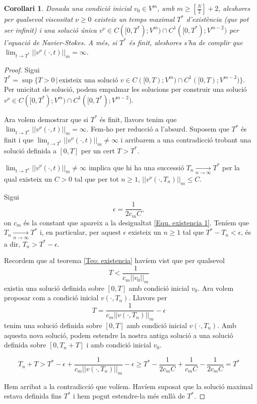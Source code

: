 \documentclass{article}
\numberwithin{equation}{section}
\newtheorem{corollari}{Corol\textperiodcentered lari}[section]
\begin{document}
\begin{corollari}\label{Cor: existencia global}
Donada una condici\'{o} inicial $v_0\in V^m$, amb $m\geq\left[\frac{N}{2}\right]+2$, aleshores per qualsevol viscositat $\nu\geq0$ existeix un temps maximal $T^*$ d'exist\`{e}ncia (que pot ser infinit) i una soluci\'{o} \'{u}nica $v^{\nu}\in C([0,T^*);V^m)\cap C^1([0,T^*);V^{m-2})$ per l'equaci\'{o} de Navier-Stokes. A m\'{e}s, si $T^*$ \'{e}s finit, aleshores s'ha de complir que $\lim_{t\to T^*}||v^{\nu}(\cdot,t)||_m=\infty$.
\end{corollari}
\begin{proof}
Sigui $T^*=\sup\{T>0\,|\,\text{existeix una soluci\'{o} }v\in C([0,T);V^m)\cap C^1([0,T);V^{m-2})\}$. Per unicitat de soluci\'{o}, podem empalmar les solucions per construir una soluci\'{o} $v^{\nu}\in C([0,T^*);V^m)\cap C^1([0,T^*);V^{m-2})$.

Ara volem demostrar que si $T^*$ \'{e}s finit, llavors tenim que $\lim_{t\to T^*}||v^{\nu}(\cdot,t)||_m=\infty$. Fem-ho per reducci\'{o} a l'absurd. Suposem que $T^*$ \'{e}s finit i que $\lim_{t\to T^*}||v^{\nu}(\cdot,t)||_m\neq\infty$ i arribarem a una contradicci\'{o} trobant una soluci\'{o} definida a $[0,T]$ per un cert $T>T^*$.

$\lim_{t\to T^*}||v^{\nu}(\cdot,t)||_m\neq\infty$ implica que hi ha una successi\'{o} $T_n\xrightarrow[n\to\infty]{}T^*$ per la qual existeix un $C>0$ tal que per tot $n\geq1$, $||v^{\nu}(\cdot,T_n)||_m\leq C$.

Sigui
\[\epsilon=\frac{1}{2c_mC},\]
on $c_m$ \'{e}s la constant que apareix a la desigualtat \eqref{Equ. existencia 1}. Ten\'{i}em que $T_n\xrightarrow[n\to\infty]{}T^*$ i, en particular, per aquest $\epsilon$ existeix un $n\geq1$ tal que $T^*-T_n<\epsilon$, \'{e}s a dir, $T_n>T^*-\epsilon$.

Recordem que al teorema \ref{Teo: existencia} hav\'{i}em vist que per qualsevol
\[T<\frac{1}{c_m||v_0||_m}\]
existia una soluci\'{o} definida sobre $[0,T]$ amb condici\'{o} inicial $v_0$. Ara volem proposar com a condici\'{o} inicial $v(\cdot,T_n)$. Llavors per
\[T=\frac{1}{c_m||v(\cdot,T_n)||_m}-\epsilon\]
tenim una soluci\'{o} definida sobre $[0,T]$ amb condici\'{o} inicial $v(\cdot,T_n)$. Amb aquesta nova soluci\'{o}, podem estendre la nostra antiga soluci\'{o} a una soluci\'{o} definida sobre $[0,T_n+T]$ i amb condici\'{o} inicial $v_0$.

\[T_n+T>T^*-\epsilon+\frac{1}{c_m||v(\cdot,T_n)||_m}-\epsilon\geq T^*-\frac{1}{2c_mC}+\frac{1}{c_mC}-\frac{1}{2c_mC}=T^*\]

Hem arribat a la contradicci\'{o} que vol\'{i}em. Hav\'{i}em suposat que la soluci\'{o} maximal estava definida fins $T^*$ i hem pogut estendre-la m\'{e}s enll\`{a} de $T^*$.
\end{proof}
\end{document}
